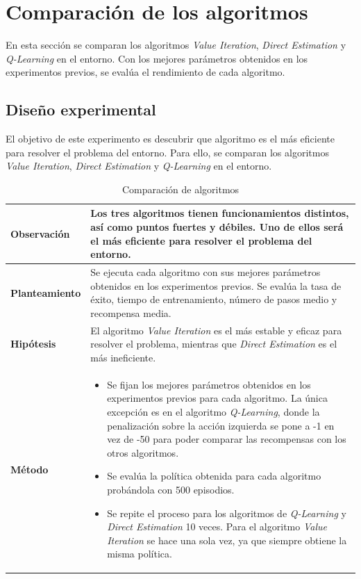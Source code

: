 \section{Comparación de los algoritmos}

En esta sección se comparan los algoritmos \textit{Value Iteration}, \textit{Direct Estimation} y \textit{Q-Learning} en el entorno. Con los mejores parámetros obtenidos en los experimentos previos, se evalúa el rendimiento de cada algoritmo.

\subsection{Diseño experimental}

El objetivo de este experimento es descubrir que algoritmo es el más eficiente para resolver el problema del entorno. Para ello, se comparan los algoritmos \textit{Value Iteration}, \textit{Direct Estimation} y \textit{Q-Learning} en el entorno.

\begin{table}[H]
    \centering
    \begin{tabularx}{\textwidth}{|p{4cm}|X|} %
        \hline %
        \textbf{Observación} & Los tres algoritmos tienen funcionamientos distintos, así como puntos fuertes y débiles. Uno de ellos será el más eficiente para resolver el problema del entorno.
        \\ \hline
        \textbf{Planteamiento} & Se ejecuta cada algoritmo con sus mejores parámetros obtenidos en los experimentos previos. Se evalúa la tasa de éxito, tiempo de entrenamiento, número de pasos medio y recompensa media.
        \\ \hline
        \textbf{Hipótesis} & El algoritmo \textit{Value Iteration} es el más estable y eficaz para resolver el problema, mientras que \textit{Direct Estimation} es el más ineficiente.
        \\ \hline
        \textbf{Método} & 
        \begin{itemize}
            \item Se fijan los mejores parámetros obtenidos en los experimentos previos para cada algoritmo. La única excepción es en el algoritmo \textit{Q-Learning}, donde la penalización sobre la acción izquierda se pone a -1 en vez de -50 para poder comparar las recompensas con los otros algoritmos.
            \item Se evalúa la política obtenida para cada algoritmo probándola con 500 episodios.
            \item Se repite el proceso para los algoritmos de \textit{Q-Learning} y \textit{Direct Estimation} 10 veces. Para el algoritmo \textit{Value Iteration} se hace una sola vez, ya que siempre obtiene la misma política.
        \end{itemize}
        \\ \hline
    \end{tabularx}
    \caption{Comparación de algoritmos}
    \label{tab:algorithmComparisonExp}
\end{table}
\newpage
